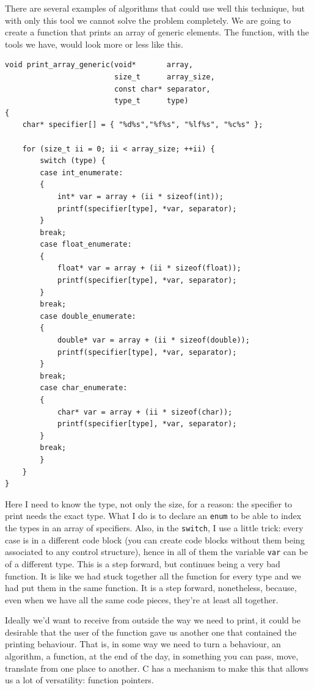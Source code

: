 \documentclass[a4paper]{article}
\begin{document}
There are several examples of algorithms that could use well this technique, but
with only this tool we cannot solve the problem completely. We are going to
create a function that prints an array of generic elements. The function, with
the tools we have, would look more or less like this.

\noindent
\begin{minipage}[H]{\linewidth}
\mbox{}
\begin{lstlisting}[style=C,
caption={Print arrays of several types},
label={lst:genericPrintf}]
void print_array_generic(void*       array,
                         size_t      array_size,
                         const char* separator,
                         type_t      type)
{
    char* specifier[] = { "%d%s","%f%s", "%lf%s", "%c%s" };

    for (size_t ii = 0; ii < array_size; ++ii) {
        switch (type) {
        case int_enumerate:
        {
            int* var = array + (ii * sizeof(int));
            printf(specifier[type], *var, separator);
        }
        break;
        case float_enumerate:
        {
            float* var = array + (ii * sizeof(float));
            printf(specifier[type], *var, separator);
        }
        break;
        case double_enumerate:
        {
            double* var = array + (ii * sizeof(double));
            printf(specifier[type], *var, separator);
        }
        break;
        case char_enumerate:
        {
            char* var = array + (ii * sizeof(char));
            printf(specifier[type], *var, separator);
        }
        break;
        }
    }
}
\end{lstlisting}
\end{minipage}

Here I need to know the type, not only the size, for a reason: the specifier
to print needs the exact type. What I do is to declare an \verb!enum! to be
able to index the types in an array of specifiers. Also, in the \verb!switch!,
I use a little trick: every case is in a different code block (you can create
code blocks without them being associated to any control structure), hence in
all of them the variable \verb!var! can be of a different type. This is a step
forward, but continues being a very bad function. It is like we had stuck
together all the function for every type and we had put them in the same
function. It is a step forward, nonetheless, because, even when we have all the
same code pieces, they're at least all together.

Ideally we'd want to receive from outside the way we need to print, it could
be desirable that the user of the function gave us another one that contained
the printing behaviour. That is, in some way we need to turn a behaviour,
an algorithm, a function, at the end of the day, in something you can pass,
move, translate from one place to another. C has a mechanism to make this that
allows us a lot of versatility: function pointers.
\end{document}
